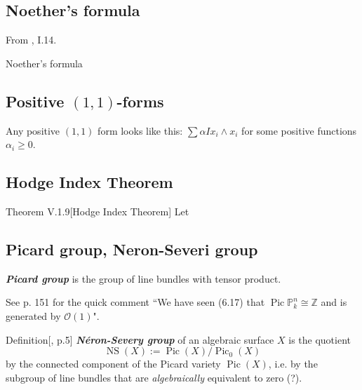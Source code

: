 \subsection{Noether's formula}

From \cite{beauville}, I.14.

\begin{thing7}{Noether's formula}\leavevmode
\end{thing7}


\subsection{Positive \((1,1)\)-forms}
Any positive \((1,1)\) form looks like this: \(\sum \alpha I x_i \wedge x_i\) for some positive functions \(\alpha_i \geq 0\).

\subsection{Hodge Index Theorem}

\begin{thing4}{Theorem V.1.9}[Hodge Index Theorem]\label{prop:V.1.9}\leavevmode
Let
\end{thing4}

\subsection{Picard group, Neron-Severi group}

\begin{defn}[dani]\leavevmode
\textit{\textbf{Picard group}} is the group of line bundles with tensor product.
\end{defn}

\begin{remark}\leavevmode
See \cite{hart} p. 151 for the quick comment ``We have seen (6.17) that \(\operatorname{Pic}\mathbb{P}^n_k \cong\mathbb{Z}\) and is generated by \(\mathcal{O}(1)\)".
\end{remark}

\begin{thing4}{Definition}[\cite{huk}, p.5]\leavevmode
\textit{\textbf{Néron-Severy group}} of an algebraic surface \(X\) is the quotient
\[\operatorname{NS}(X):=\operatorname{Pic}(X) /\operatorname{Pic}_0(X)\]
by the connected component of the Picard variety \(\operatorname{Pic}(X)\), i.e. by the subgroup of line bundles that are \textit{algebraically} equivalent to zero (?).
\end{thing4}

